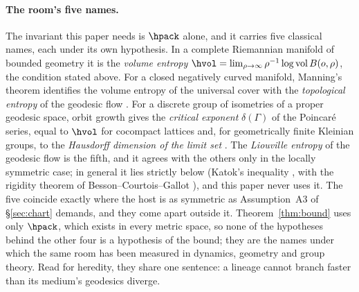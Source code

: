 

\paragraph{The room's five names.}
The invariant this paper needs is $\hpack$ alone, and it carries five classical names, each under its own
hypothesis. In a complete Riemannian manifold of bounded geometry it is the \emph{volume entropy}
$\hvol=\lim_{\rho\to\infty}\rho^{-1}\log\mathrm{vol}\,B(o,\rho)$, the condition stated above. For a closed negatively
curved manifold, Manning's theorem identifies the volume entropy of the universal cover with the \emph{topological
entropy} of the geodesic flow \cite{manning1979}. For a discrete group of isometries of a proper geodesic space, orbit
growth gives the \emph{critical exponent} $\delta(\Gamma)$ of the Poincar\'e series, equal to $\hvol$ for cocompact
lattices \cite{patterson1976,sullivan1979} and, for geometrically finite Kleinian groups, to the \emph{Hausdorff
dimension of the limit set} \cite{bishopjones1997}. The \emph{Liouville entropy} of the geodesic flow is the fifth, and
it agrees with the others only in the locally symmetric case; in general it lies strictly below (Katok's inequality
\cite{katok1982}, with the rigidity theorem of Besson--Courtois--Gallot \cite{bcg1995}), and this paper never uses
it. The five coincide exactly where the host is as symmetric as Assumption~A3 of \S\ref{sec:chart} demands, and they
come apart outside it. Theorem~\ref{thm:bound} uses only $\hpack$, which exists in every metric space, so none of the
hypotheses behind the other four is a hypothesis of the bound; they are the names under which the same room has been
measured in dynamics, geometry and group theory. Read for heredity, they share one sentence: a lineage cannot branch
faster than its medium's geodesics diverge.

